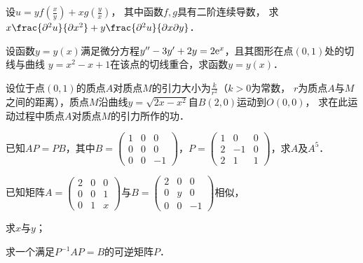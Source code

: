 \documentclass[plain,noanswer,medmath]{../../template/jnuexam}
\begin{document}

\begin{problem}
设$u=yf\left(\frac{x}{y} \right)+xg\left(\frac{y}{x} \right)$，
其中函数$f,g$具有二阶连续导数，
求$x\frac{\pd^2 u}{\pd x^2}+y\frac{\pd^2 u}{\pdx\pd y}$．
\end{problem}



\begin{problem}
设函数$y=y(x)$满足微分方程$y''-3y'+2y=2\mathrm{e}^x$，且其图形在点$(0,1)$处的切线与曲线
$y= x^2-x+1$在该点的切线重合，求函数$y=y(x)$．
\end{problem}



\begin{problem}
设位于点$(0,1)$的质点$A$对质点$M$的引力大小为$\frac{k}{r^2}$（$k>0$为常数，
$r$为质点$A$与$M$之间的距离），质点$M$沿曲线$y=\sqrt{2x- x^2}$自$B(2,0)$运动到$O(0,0)$，
求在此运动过程中质点$A$对质点$M$的引力所作的功．
\end{problem}



\begin{problem}
已知$AP=PB$，其中$B=\begin{pmatrix}
  1 & 0 & 0 \\
  0 & 0 & 0 \\
  0 & 0 & -1
\end{pmatrix}$，$P=\begin{pmatrix}
  1 &  0 & 0 \\
  2 & -1 & 0 \\
  2 &  1 & 1
\end{pmatrix}$，求$A$及$A^5$．
\end{problem}



\begin{problem}
已知矩阵$A=\begin{pmatrix}
  2 & 0 & 0 \\
  0 & 0 & 1 \\
  0 & 1 & x
\end{pmatrix}$与$B=\begin{pmatrix}
  2 & 0 & 0 \\
  0 & y & 0 \\
  0 & 0 & -1
\end{pmatrix}$相似，\par
\begin{enumerate*}
\item 求$x$与$y$；
\item 求一个满足$P^{-1} AP=B$的可逆矩阵$P$．
\end{enumerate*}
\end{problem}
\end{document}
